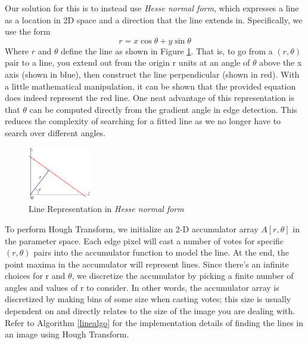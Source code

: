 \documentclass{article}
\begin{document}
Our solution for this is to instead use \textit{Hesse normal form}, which expresses a line as a location in 2D space and a direction that the line extends in. Specifically, we use the form
\begin{equation}r=x\cos{\theta}+y\sin{\theta}\end{equation}
Where \begin{math}r\end{math} and \begin{math}\theta\end{math} define the line as shown in Figure \ref{fig:diagram}. That is, to go from a \begin{math}(r,\theta)\end{math} pair to a line, you extend out from the origin r units at an angle of \begin{math}\theta\end{math} above the x axis (shown in blue), then construct the line perpendicular (shown in red). With a little mathematical manipulation, it can be shown that the provided equation does indeed represent the red line. One neat advantage of this representation is that $\theta$ can be computed directly from the gradient angle in edge detection. This reduces the complexity of searching for a fitted line as we no longer have to search over different angles.

\begin{figure}[!h]
    \centering
    \includegraphics[width=0.25\textwidth]{diagram}
    \caption{Line Representation in \textit{Hesse normal form}}
    \label{fig:diagram}
\end{figure}

\noindent
To perform Hough Transform, we initialize an 2-D accumulator array \begin{math}A[r,\theta]\end{math} in the parameter space. Each edge pixel will cast a number of votes for specific $(r, \theta)$ pairs into the accumulator function to model the line. At the end, the point maxima in the accumulator will represent lines. Since there's an infinite choices for r and $\theta$, we discretize the accumulator by picking a finite number of angles and values of r to consider. In other words, the accumulator array is discretized by making bins of some size when casting votes; this size is usually dependent on and directly relates to the size of the image you are dealing with. Refer to Algorithm \ref{linealgo} for the implementation details of finding the lines in an image using Hough Transform.
\end{document}

